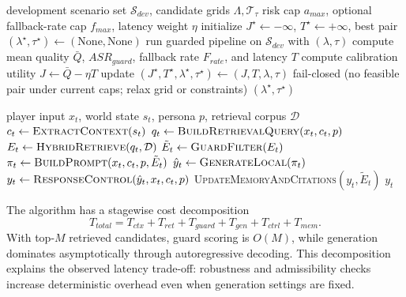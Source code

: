 ﻿\documentclass[a4paper,12pt]{article}
\begin{document}
\begin{algorithm}[H]
\caption{Guard-threshold calibration under risk constraints}
\begin{algorithmic}[1]
\Require development scenario set \(\mathcal{S}_{dev}\), candidate grids \(\Lambda,\mathcal{T}_{\tau}\)
\Require risk cap \(a_{max}\), optional fallback-rate cap \(f_{max}\), latency weight \(\eta\)
\State initialize \(J^\star\gets-\infty\), \(T^\star\gets+\infty\), best pair \((\lambda^\star,\tau^\star)\gets(\text{None},\text{None})\)
    \State run guarded pipeline on \(\mathcal{S}_{dev}\) with \((\lambda,\tau)\)
    \State compute mean quality \(\bar{Q}\), \(ASR_{guard}\), fallback rate \(F_{rate}\), and latency \(T\)
      \State compute calibration utility \(J\gets \bar{Q}-\eta T\)
        \State update \((J^\star,T^\star,\lambda^\star,\tau^\star)\gets(J,T,\lambda,\tau)\)
      \EndIf
    \EndIf
  \EndFor
\EndFor
{}
  \State \Return fail-closed (no feasible pair under current caps; relax grid or constraints)
\EndIf
\State \Return \((\lambda^\star,\tau^\star)\)
\end{algorithmic}
\end{algorithm}

\begin{algorithm}[H]
\caption{Runtime inference with guarded response control}
\begin{algorithmic}[1]
\Require player input $x_t$, world state $s_t$, persona $p$, retrieval corpus $\mathcal{D}$
\State $c_t \gets \textsc{ExtractContext}(s_t)$
\State $q_t \gets \textsc{BuildRetrievalQuery}(x_t,c_t,p)$
\State $E_t \gets \textsc{HybridRetrieve}(q_t,\mathcal{D})$
\State $\tilde{E}_t \gets \textsc{GuardFilter}(E_t)$
\State $\pi_t \gets \textsc{BuildPrompt}(x_t,c_t,p,\tilde{E}_t)$
\State $\hat{y}_t \gets \textsc{GenerateLocal}(\pi_t)$
\State $y_t \gets \textsc{ResponseControl}(\hat{y}_t, x_t, c_t, p)$
\State \textsc{UpdateMemoryAndCitations}$(y_t,\tilde{E}_t)$
\State \Return $y_t$
\end{algorithmic}
\end{algorithm}

The algorithm has a stagewise cost decomposition
\begin{equation}
T_{total}=T_{ctx}+T_{ret}+T_{guard}+T_{gen}+T_{ctrl}+T_{mem}.
\end{equation}
With top-\(M\) retrieved candidates, guard scoring is \(O(M)\), while generation dominates asymptotically through autoregressive decoding. This decomposition explains the observed latency trade-off: robustness and admissibility checks increase deterministic overhead even when generation settings are fixed.
\end{document}
